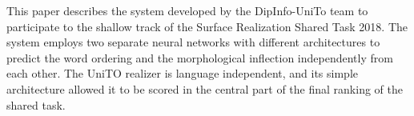 This paper describes the system developed by the DipInfo-UniTo team to participate to the shallow track of the Surface Realization Shared Task 2018. The system employs two separate neural networks with different architectures to predict the word ordering and the morphological inflection independently from each other. The UniTO realizer is language independent, and its simple architecture allowed it to be scored in the central part of the final ranking of the shared task.
